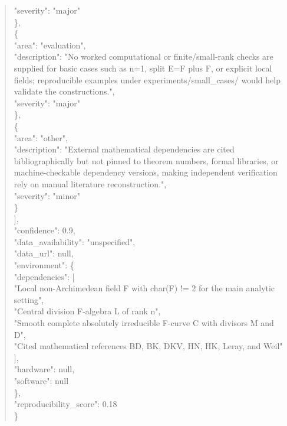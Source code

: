 \documentclass[11pt]{article}
\begin{document}
\begin{quote}
      "severity": "major"\\
    \},\\
    \{\\
      "area": "evaluation",\\
      "description": "No worked computational or finite/small-rank checks are supplied for basic cases such as n=1, split E=F plus F, or explicit local fields; reproducible examples under experiments/small\_cases/ would help validate the constructions.",\\
      "severity": "major"\\
    \},\\
    \{\\
      "area": "other",\\
      "description": "External mathematical dependencies are cited bibliographically but not pinned to theorem numbers, formal libraries, or machine-checkable dependency versions, making independent verification rely on manual literature reconstruction.",\\
      "severity": "minor"\\
    \}\\
  ],\\
  "confidence": 0.9,\\
  "data\_availability": "unspecified",\\
  "data\_url": null,\\
  "environment": \{\\
    "dependencies": [\\
      "Local non-Archimedean field F with char(F) != 2 for the main analytic setting",\\
      "Central division F-algebra L of rank n",\\
      "Smooth complete absolutely irreducible F-curve C with divisors M and D",\\
      "Cited mathematical references BD, BK, DKV, HN, HK, Leray, and Weil"\\
    ],\\
    "hardware": null,\\
    "software": null\\
  \},\\
  "reproducibility\_score": 0.18\\
\}\\
\end{quote}
\end{document}
